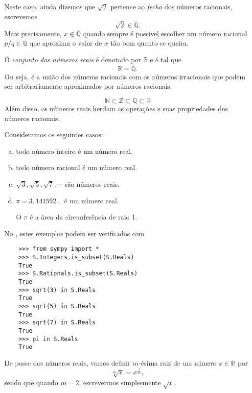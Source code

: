 Neste caso, ainda dizemos que $\sqrt{2}$ pertence ao \emph{fecho} dos números racionais, escrevemos
\begin{equation}
  \sqrt{2}\in\overline{\mathbb{Q}}.
\end{equation}
Mais precisamente, $x\in\overline{\mathbb{Q}}$ quando sempre é possível escolher um número racional $p/q\in\mathbb{Q}$ que aproxima o valor de $x$ tão bem quanto se queira.

O \emph{conjunto dos números reais} é denotado por $\mathbb{R}$ e é tal que
\begin{equation}
  \mathbb{R} = \overline{\mathbb{Q}}.
\end{equation}
Ou seja, é a união dos números racionais com os números irracionais que podem ser arbitrariamente aproximados por números racionais.

\begin{obs}
  \begin{equation}
    \mathbb{N}\subset\mathbb{Z}\subset\mathbb{Q}\subset\mathbb{R}
  \end{equation}
  Além disso, os números reais herdam as operações e suas propriedades dos números racionais.
\end{obs}

\begin{ex}
  Consideramos os seguintes casos:
  \begin{enumerate}[a)]
  \item todo número inteiro é um número real.
  \item todo número racional é um número real.
  \item $\sqrt{3}, \sqrt{5}, \sqrt{7}, \cdots$ são números reais.
  \item $\pi = 3,141592\ldots$ é um número real.

    O $\pi$ é a área da circunferência de raio 1.
  \end{enumerate}

  \ifispython
  No \python, estes exemplos podem ser verificados com
  \begin{lstlisting}
    >>> from sympy import *
    >>> S.Integers.is_subset(S.Reals)
    True
    >>> S.Rationals.is_subset(S.Reals)
    True
    >>> sqrt(3) in S.Reals
    True
    >>> sqrt(5) in S.Reals
    True
    >>> sqrt(7) in S.Reals
    True
    >>> pi in S.Reals
    True
  \end{lstlisting}
  \fi
\end{ex}

De posse dos números reais, vamos definir $m$-ésima raiz de um número $x\in\mathbb{R}$ por
\begin{equation}
  \sqrt[m]{x} = x^{\frac{1}{m}},
\end{equation}
sendo que quando $m=2$, escrevermos simplesmente $\sqrt{x}$.

